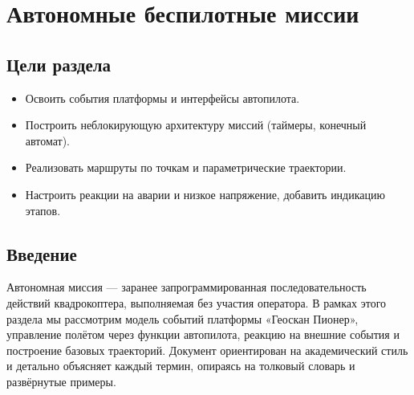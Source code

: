 \section{Автономные беспилотные миссии}
\subsection*{Цели раздела}
\begin{itemize}
  \item Освоить события платформы и интерфейсы автопилота.
  \item Построить неблокирующую архитектуру миссий (таймеры, конечный автомат).
  \item Реализовать маршруты по точкам и параметрические траектории.
  \item Настроить реакции на аварии и низкое напряжение, добавить индикацию этапов.
\end{itemize}
\subsection{Введение}
Автономная миссия — заранее запрограммированная последовательность действий квадрокоптера, выполняемая без участия оператора. В рамках этого раздела мы рассмотрим модель событий платформы «Геоскан Пионер», управление полётом через функции автопилота, реакцию на внешние события и построение базовых траекторий. Документ ориентирован на академический стиль и детально объясняет каждый термин, опираясь на толковый словарь и развёрнутые примеры.

